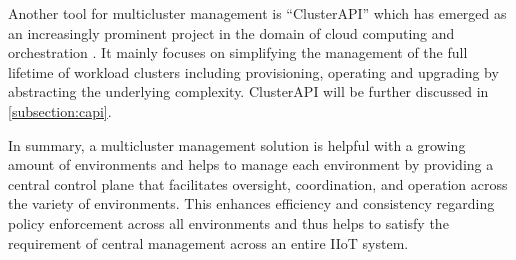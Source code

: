     Another tool for multicluster management is ``ClusterAPI'' which has emerged as an increasingly prominent project in the domain of cloud computing and orchestration \cite{efficient_k8s_capi}. It mainly focuses on simplifying the management of the full lifetime of workload clusters including provisioning, operating and upgrading by abstracting the underlying complexity. ClusterAPI will be further discussed in \autoref{subsection:capi}.\newline

    \noindent In summary, a multicluster management solution is helpful with a growing amount of environments and helps to manage each environment by providing a central control plane that facilitates oversight, coordination, and operation across the variety of environments. This enhances efficiency and consistency regarding policy enforcement across all environments and thus helps to satisfy the requirement of central management across an entire IIoT system.

